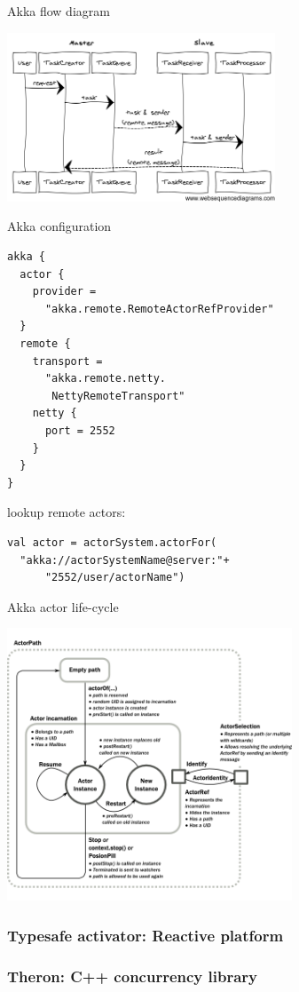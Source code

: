 \documentclass{myproc}
\begin{document}
\w Akka flow diagram

\centerline{\includegraphics[width=8cm]{pics/akka-flow}}

\w Akka configuration
\begin{verbatim}
akka {
  actor {
    provider = 
      "akka.remote.RemoteActorRefProvider"
  }
  remote {
    transport = 
      "akka.remote.netty.
       NettyRemoteTransport"
    netty {
      port = 2552
    }
  }
}
\end{verbatim}
\w lookup remote actors:
\begin{verbatim}
val actor = actorSystem.actorFor(
  "akka://actorSystemName@server:"+
      "2552/user/actorName")
\end{verbatim}

\w Akka actor life-cycle

\centerline{\includegraphics[width=8.5cm]{pics/akka-lifecycle}}

\eit


\subsubsection{Typesafe activator: Reactive platform}
\subsubsection{Theron: C++ concurrency library}
\end{document}
